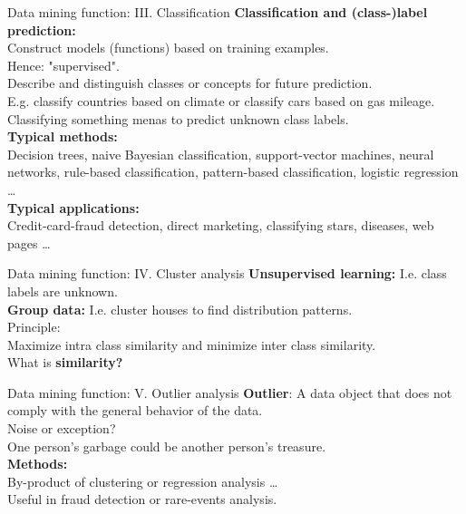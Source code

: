 \documentclass[aspectratio=169,t]{beamer}
\begin{document}
  {
    \begin{frame}{Data mining function: III. Classification}
    \textbf{Classification and (class-)label prediction:}\\
    Construct models (functions) based on training examples. \\
    Hence: "supervised".\\
    Describe and distinguish classes or concepts for future prediction.\\
    E.g. classify countries based on climate or classify cars based on gas mileage.\\
    Classifying something menas to predict unknown class labels. \\[0.5cm]

    \textbf{Typical methods:}\\
    Decision trees, naive Bayesian classification, support-vector machines, neural networks, rule-based classification, pattern-based classification, logistic regression \ldots\\[0.5cm]

    \textbf{Typical applications:}\\
    Credit-card-fraud detection, direct marketing, classifying stars, diseases, web pages \ldots
    \end{frame}
  }

  {
    \begin{frame}{Data mining function: IV. Cluster analysis}
    \textbf{Unsupervised learning:} I.e. class labels are unknown.\\
    \textbf{Group data:} I.e. cluster houses to find distribution patterns.\\[0.5cm]

    Principle:\\
    Maximize intra class similarity and minimize inter class similarity.\\[0.5cm]

    What is \textbf{similarity?}
    \end{frame}
  }

  {
    \begin{frame}{Data mining function: V. Outlier analysis}
    \textbf{Outlier}: A data object that does not comply with the general behavior of the data.\\[0.5cm]

    Noise or exception?\\
    One person's garbage could be another person's treasure.\\[0.5cm]

    \textbf{Methods:}\\
    By-product of clustering or regression analysis \ldots \\
    Useful in fraud detection or rare-events analysis.
    \end{frame}
  }
\end{document}
